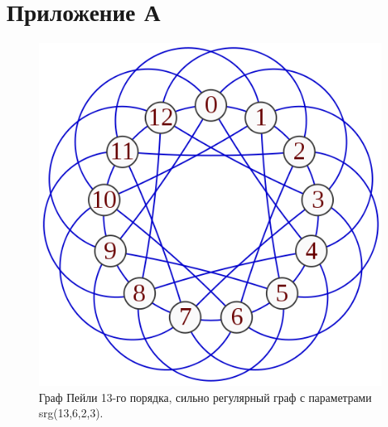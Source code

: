 \section*{Приложение А}
\label{sec:Apendix_1} 
\large


\begin{figure}[ht]
\centering 
    \includegraphics[scale=0.7]{srg_example.png}
    \caption{Граф Пейли 13-го порядка, сильно регулярный граф с параметрами srg(13,6,2,3).}
    \label{srg}
\end{figure}


